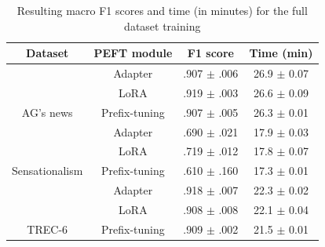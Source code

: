 \begin{table}[htbp]
\centering

\begin{tabular}{c|c|c|c}
\toprule
\textbf{Dataset} & \textbf{PEFT module} & \textbf{F1 score} & \textbf{Time (min)}\\
\midrule
 & Adapter & .907 $\pm$ {\small .006} & 26.9 $\pm$ {\small 0.07}\\

 & LoRA & .919 $\pm$ {\small .003} & 26.6 $\pm$ {\small 0.09}\\

\multirow{-3}{*}{\centering\arraybackslash AG's news} & Prefix-tuning & .907 $\pm$ {\small .005} & 26.3 $\pm$ {\small 0.01}\\
\hline
 & Adapter & .690 $\pm$ {\small .021} & 17.9 $\pm$ {\small 0.03}\\

 & LoRA & .719 $\pm$ {\small .012} & 17.8 $\pm$ {\small 0.07}\\

\multirow{-3}{*}{\centering\arraybackslash Sensationalism} & Prefix-tuning & .610 $\pm$ {\small .160} & 17.3 $\pm$ {\small 0.01}\\
\hline
 & Adapter & .918 $\pm$ {\small .007} & 22.3 $\pm$ {\small 0.02}\\

 & LoRA & .908 $\pm$ {\small .008} & 22.1 $\pm$ {\small 0.04}\\

\multirow{-3}{*}{\centering\arraybackslash TREC-6} & Prefix-tuning & .909 $\pm$ {\small .002} & 21.5 $\pm$ {\small 0.01}\\
\bottomrule
\end{tabular}
\caption{Resulting macro F1 scores and time (in minutes) for the full dataset training}
\label{tab:baselines_full_time}
\end{table}

